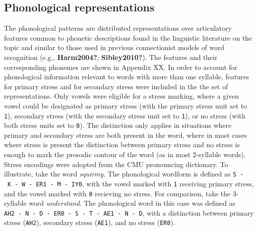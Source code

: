 \documentclass[
  american,
  ,man,floatsintext]{apa6}
\begin{document}
\hypertarget{phonological-representations}{%
\subsection{Phonological representations}\label{phonological-representations}}

The phonological patterns are distributed representations over articulatory features common to phonetic descriptions found in the linguistic literature on the topic and similar to those used in previous connectionist models of word recognition (e.g., \textbf{Harm2004?}; \textbf{Sibley2010?}). The features and their corresponding phonemes are shown in Appendix XX. In order to account for phonological information relevant to words with more than one syllable, features for primary stress and for secondary stress were included in the the set of representations. Only vowels were eligible for a stress marking, where a given vowel could be designated as primary stress (with the primary stress unit set to \texttt{1}), secondary stress (with the secondary stress unit set to \texttt{1}), or no stress (with both stress units set to \texttt{0}). The distinction only applies in situations where primary and secondary stress are both present in the word, where in most cases where stress is present the distinction between primary stress and no stress is enough to mark the prosodic contour of the word (as in most 2-syllable words). Stress encodings were adopted from the CMU pronouncing dictionary. To illustrate, take the word \emph{squirmy}. The phonological wordform is defined as \texttt{S\ -\ K\ -\ W\ -\ ER1\ -\ M\ -\ IY0}, with the vowel marked with \texttt{1} receiving primary stress, and the vowel marked with \texttt{0} recieving no stress. For comparison, take the 3-syllable word \emph{understand}. The phonological word in this case was defined as \texttt{AH2\ -\ N\ -\ D\ -\ ER0\ -\ S\ -\ T\ -\ AE1\ -\ N\ -\ D}, with a distinction between primary stress (\texttt{AH2}), secondary stress (\texttt{AE1}), and no stress (\texttt{ER0}).
\end{document}

